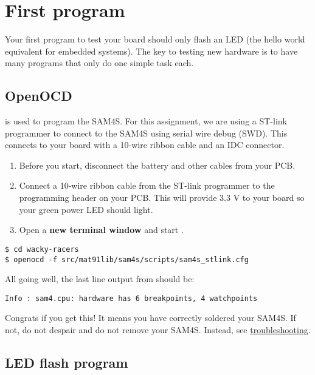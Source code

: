 \section{First program}
\label{first-program}

Your first program to test your board should only flash an LED (the
hello world equivalent for embedded systems). The key to testing new
hardware is to have many programs that only do one simple task each.

\subsection{OpenOCD}
\label{openocd}

 is used to program the SAM4S. For this assignment,
we are using a ST-link programmer to connect to the SAM4S using serial
wire debug (SWD). This connects to your board with a 10-wire ribbon
cable and an IDC connector.

\begin{enumerate}
\item
  Before you start, disconnect the battery and other cables from your
  PCB.
\item
  Connect a 10-wire ribbon cable from the ST-link programmer to the
  programming header on your PCB. This will provide 3.3 V to your
  board so your green power LED should light.
\item
  Open a \textbf{new terminal window} and start .
\end{enumerate}

\begin{verbatim}
$ cd wacky-racers
$ openocd -f src/mat91lib/sam4s/scripts/sam4s_stlink.cfg
\end{verbatim}

All going well, the last line output from  should be:

\begin{verbatim}
Info : sam4.cpu: hardware has 6 breakpoints, 4 watchpoints
\end{verbatim}

Congrats if you get this! It means you have correctly soldered your
SAM4S. If not, do not despair and do not remove your SAM4S. Instead,
see \protect\hyperref[troubleshooting]{troubleshooting}.


\subsection{LED flash program}
\label{led-flash-program}

